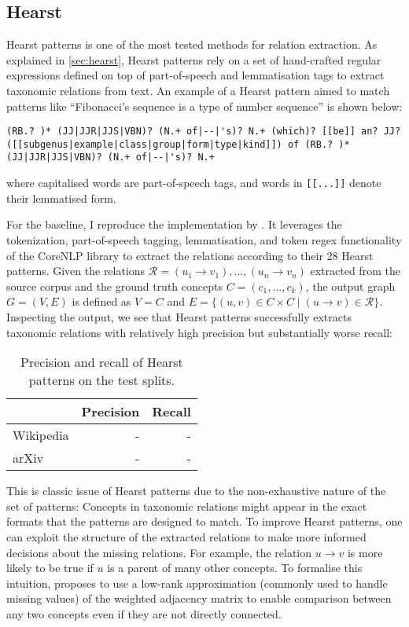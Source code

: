 \subsection{Hearst}
Hearst patterns \cite{hearst1998automated} is one of the most tested methods for relation extraction. As explained in \cref{sec:hearst}, Hearst patterns rely on a set of hand-crafted regular expressions defined on top of part-of-speech and lemmatisation tags to extract taxonomic relations from text. An example of a Hearst pattern aimed to match patterns like ``Fibonacci's sequence is a type of number sequence'' is shown below:
\begin{lstlisting}
(RB.? )* (JJ|JJR|JJS|VBN)? (N.+ of|--|'s)? N.+ (which)? [[be]] an? JJ? ([[subgenus|example|class|group|form|type|kind]]) of (RB.? )* (JJ|JJR|JJS|VBN)? (N.+ of|--|'s)? N.+
\end{lstlisting}
where capitalised words are part-of-speech tags, and words in \texttt{[[...]]} denote their lemmatised form.

For the baseline, I reproduce the implementation by \citet{roller2018hearst}. It leverages the tokenization, part-of-speech tagging, lemmatisation, and token regex functionality of the CoreNLP library \cite{manning2014stanford} to extract the relations according to their 28 Hearst patterns. Given the relations $\mathcal{R} = (u_1 \to v_1), \dots, (u_n \to v_n)$ extracted from the source corpus and the ground truth concepts $C = (c_1, \dots, c_k)$, the output graph $G = (V, E)$ is defined as $V = C$ and $E = \{(u, v) \in C \times C \mid (u \to v) \in \mathcal{R}\}$. Inspecting the output, we see that Hearst patterns successfully extracts taxonomic relations with relatively high precision but substantially worse recall:
\begin{table}[H]
    \centering
    \begin{tabular}{lrr}
        \toprule
                  & Precision & Recall \\
        \midrule
        Wikipedia & -         & -      \\
        arXiv     & -         & -      \\
        \bottomrule
    \end{tabular}
    \caption{Precision and recall of Hearst patterns on the test splits.}
    \label{table:hearst-precision-recall}
\end{table}
This is classic issue of Hearst patterns due to the non-exhaustive nature of the set of patterns: Concepts in taxonomic relations might appear in the exact formats that the patterns are designed to match. To improve Hearst patterns, one can exploit the structure of the extracted relations to make more informed decisions about the missing relations. For example, the relation $u \to v$ is more likely to be true if $u$ is a parent of many other concepts. To formalise this intuition, \citet{roller2018hearst} proposes to use a low-rank approximation \cite{schmidt1907theorie} (commonly used to handle missing values) of the weighted adjacency matrix to enable comparison between any two concepts even if they are not directly connected. 

